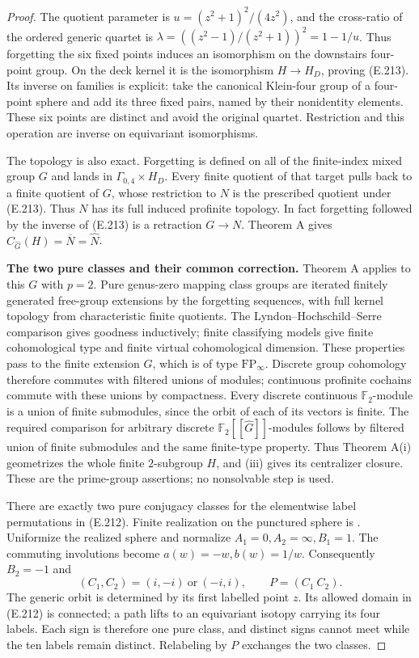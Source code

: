 \begin{proof}
The quotient parameter is $u=(z^2+1)^2/(4z^2)$, and the
cross-ratio of the ordered generic quartet is
$\lambda=((z^2-1)/(z^2+1))^2=1-1/u$.
Thus forgetting the six fixed points induces an isomorphism
on the downstairs four-point group.  On the deck kernel it is
the isomorphism $H\to H_D$, proving (E.213).
Its inverse on families is explicit: take the canonical
Klein-four group of a four-point sphere and add its three
fixed pairs, named by their nonidentity elements.
These six points are distinct and avoid the original quartet.
Restriction and this operation are inverse on equivariant
isomorphisms.

The topology is also exact.  Forgetting is defined on all of
the finite-index mixed group $G$ and lands in
$\Gamma_{0,4}\times H_D$.  Every finite quotient of that target
pulls back to a finite quotient of $G$, whose restriction to $N$
is the prescribed quotient under (E.213).
Thus $N$ has its full induced profinite topology.  In fact
forgetting followed by the inverse of (E.213) is a retraction
$G\to N$.  Theorem A gives
$C_{\widehat G}(H)=\overline N=\widehat N$.

\par\medskip\noindent\textbf{The two pure classes and their common correction.}\quad
Theorem A applies to this $G$ with $p=2$.
Pure genus-zero mapping class groups are iterated finitely
generated free-group extensions by the forgetting sequences,
with full kernel topology from characteristic finite quotients.
The Lyndon--Hochschild--Serre comparison gives goodness
inductively; finite classifying models give finite cohomological
type and finite virtual cohomological dimension.
These properties pass to the finite extension $G$, which is of
type $\mathrm{FP}_\infty$.  Discrete group cohomology therefore
commutes with filtered unions of modules; continuous profinite
cochains commute with these unions by compactness.  Every discrete
continuous $\mathbb F_2$-module is a union of finite submodules,
since the orbit of each of its vectors is finite.
The required comparison for arbitrary discrete
$\mathbb F_2[[\widehat G]]$-modules follows by filtered union
of finite submodules and the same finite-type property.
Thus Theorem A(i) geometrizes the whole finite $2$-subgroup $H$,
and (iii) gives its centralizer closure.
These are the prime-group assertions; no nonsolvable step is used.

There are exactly two pure conjugacy classes for the elementwise
label permutations in (E.212).
Finite realization on the punctured sphere is
\cite[Theorem 1 and its punctured extension, p.~236]{ET_Kerckhoff1983}.
Uniformize the realized sphere and normalize
$A_1=0,A_2=\infty,B_1=1$.
The commuting involutions become $a(w)=-w,b(w)=1/w$.
Consequently $B_2=-1$ and
\[
 (C_1,C_2)=(i,-i)\ \text{or}\ (-i,i),\qquad
 P=(C_1\ C_2).
                                                               \tag{E.214}
\]
The generic orbit is determined by its first labelled point $z$.
Its allowed domain in (E.212) is connected; a path lifts to an
equivariant isotopy carrying its four labels.  Each sign is
therefore one pure class, and distinct signs cannot meet while
the ten labels remain distinct.  Relabeling by $P$ exchanges
the two classes.


\end{proof}

